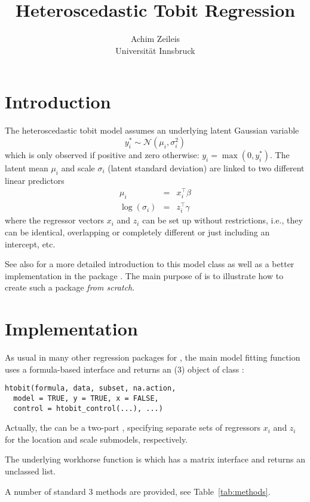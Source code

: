 \documentclass[nojss]{jss}
\author{Achim Zeileis\\Universit\"at Innsbruck}
\title{Heteroscedastic Tobit Regression}
\begin{document}


\section{Introduction}

The heteroscedastic tobit model assumes an underlying latent Gaussian variable
\[
  y_i^* \sim \mathcal{N}(\mu_i, \sigma_i^2)
\]
which is only observed if positive and zero otherwise: $y_i = \max(0, y_i^*)$.
The latent mean $\mu_i$ and scale $\sigma_i$ (latent standard deviation)
are linked to two different linear predictors
\begin{eqnarray*}
\mu_i & = & x_i^\top \beta \\
\log(\sigma_i) & = & z_i^\top \gamma
\end{eqnarray*}
where the regressor vectors $x_i$ and $z_i$ can be set up without restrictions,
i.e., they can be identical, overlapping or completely different or just including an intercept, etc.

See also \cite{crch} for a more detailed introduction to this model class as well as
a better implementation in the package . The main purpose of  is
to illustrate how to create such a package \emph{from scratch}.


\section{Implementation}

As usual in many other regression packages for  \citep{R}, the main model fitting function 
uses a formula-based interface and returns an (3) object of class :
%
\begin{verbatim}
htobit(formula, data, subset, na.action,
  model = TRUE, y = TRUE, x = FALSE,
  control = htobit_control(...), ...)
\end{verbatim}
%
Actually, the  can be a two-part  \citep{Formula}, specifying separate sets of regressors
$x_i$ and $z_i$ for the location and scale submodels, respectively.

The underlying workhorse function is  which has a matrix interface and returns an unclassed list.

A number of standard 3 methods are provided, see Table~\ref{tab:methods}.
\end{document}
